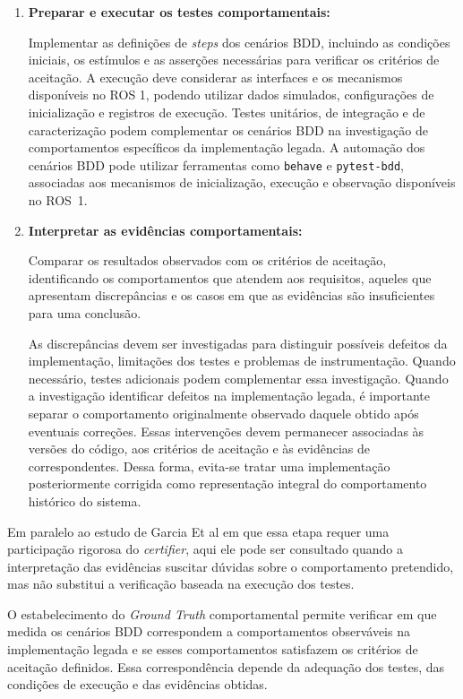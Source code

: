 \begin{enumerate}

    \item \textbf{Preparar e executar os testes comportamentais:}

    Implementar as definições de \textit{steps} dos cenários BDD, incluindo as condições iniciais, os estímulos e as asserções necessárias para verificar os critérios de aceitação. A execução deve considerar as interfaces e os mecanismos disponíveis no ROS 1, podendo utilizar dados simulados, configurações de inicialização e registros de execução. Testes unitários, de integração e de caracterização podem complementar os cenários BDD na investigação de comportamentos específicos da implementação legada. A automação dos cenários BDD pode utilizar ferramentas como \texttt{behave} e \texttt{pytest-bdd}, associadas aos mecanismos de inicialização, execução e observação disponíveis no ROS~1.

    \item \textbf{Interpretar as evidências comportamentais:}

    Comparar os resultados observados com os critérios de aceitação, identificando os comportamentos que atendem aos requisitos, aqueles que apresentam discrepâncias e os casos em que as evidências são insuficientes para uma conclusão.

    As discrepâncias devem ser investigadas para distinguir possíveis defeitos da implementação, limitações dos testes e problemas de instrumentação. Quando necessário, testes adicionais podem complementar essa investigação. Quando a investigação identificar defeitos na implementação legada, é importante separar o comportamento originalmente observado daquele obtido após eventuais correções. Essas intervenções devem permanecer associadas às versões do código, aos critérios de aceitação e às evidências de correspondentes. Dessa forma, evita-se tratar uma implementação posteriormente corrigida como representação integral do comportamento histórico do sistema.


\end{enumerate}

Em paralelo ao estudo de Garcia Et al em que essa etapa requer uma participação rigorosa do \textit{certifier}, aqui ele pode ser consultado quando a interpretação das evidências suscitar
dúvidas sobre o comportamento pretendido,
mas não substitui a verificação baseada na
execução dos testes.

O estabelecimento do \textit{Ground Truth} comportamental permite verificar em que medida os cenários BDD correspondem a comportamentos
observáveis na implementação legada e se esses comportamentos satisfazem os critérios de aceitação definidos. Essa correspondência depende da adequação
dos testes, das condições de execução e das evidências obtidas.




